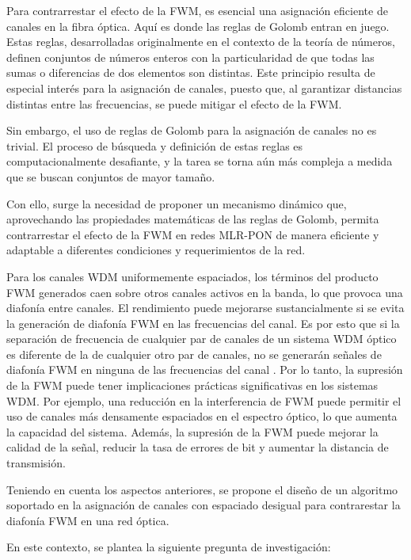 Para contrarrestar el efecto de la FWM, es esencial una asignación eficiente de canales en la fibra óptica. Aquí es donde las reglas de Golomb entran en juego. Estas reglas, desarrolladas originalmente en el contexto de la teoría de números, definen conjuntos de números enteros con la particularidad de que todas las sumas o diferencias de dos elementos son distintas. Este principio resulta de especial interés para la asignación de canales, puesto que, al garantizar distancias distintas entre las frecuencias, se puede mitigar el efecto de la FWM.

Sin embargo, el uso de reglas de Golomb para la asignación de canales no es trivial. El proceso de búsqueda y definición de estas reglas es computacionalmente desafiante, y la tarea se torna aún más compleja a medida que se buscan conjuntos de mayor tamaño.

Con ello, surge la necesidad de proponer un mecanismo dinámico que, aprovechando las propiedades matemáticas de las reglas de Golomb, permita contrarrestar el efecto de la FWM en redes MLR-PON de manera eficiente y adaptable a diferentes condiciones y requerimientos de la red.

Para los canales WDM uniformemente espaciados, los términos del producto FWM generados caen sobre otros canales activos en la banda, lo que provoca una diafonía entre canales. El rendimiento puede mejorarse sustancialmente si se evita la generación de diafonía FWM en las frecuencias del canal. Es por esto que si la separación de frecuencia de cualquier par de canales de un sistema WDM óptico es diferente de la de cualquier otro par de canales, no se generarán señales de diafonía FWM en ninguna de las frecuencias del canal \cite{Bansal}. Por lo tanto, la supresión de la FWM puede tener implicaciones prácticas significativas en los sistemas WDM. Por ejemplo, una reducción en la interferencia de FWM puede permitir el uso de canales más densamente espaciados en el espectro óptico, lo que aumenta la capacidad del sistema. Además, la supresión de la FWM puede mejorar la calidad de la señal, reducir la tasa de errores de bit y aumentar la distancia de transmisión.


Teniendo en cuenta los aspectos anteriores, se propone el diseño de un algoritmo soportado en la asignación de canales con espaciado desigual para contrarestar la diafonía FWM en una red óptica.


En este contexto, se plantea la siguiente pregunta de investigación:

